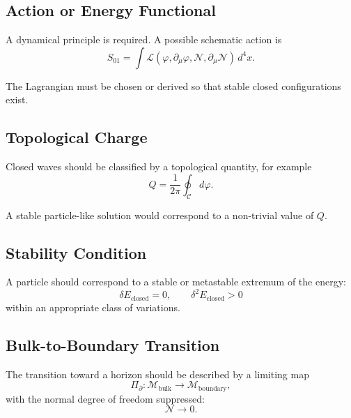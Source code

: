 \documentclass[11pt,a4paper]{article}
\newcommand{\phase}{\varphi}
\newcommand{\normal}{\mathcal{N}}
\newcommand{\memory}{\mathcal{M}}
\newcommand{\contour}{\mathcal{C}}
\begin{document}
\subsection*{Action or Energy Functional}

A dynamical principle is required. A possible schematic action is
\begin{equation}
S_{01} = \int \mathcal{L}(\phase, \partial_\mu \phase, \normal, \partial_\mu \normal)\, d^4x.
\end{equation}

The Lagrangian must be chosen or derived so that stable closed configurations exist.

\subsection*{Topological Charge}

Closed waves should be classified by a topological quantity, for example
\begin{equation}
Q = \frac{1}{2\pi}\oint_{\contour} d\phase.
\end{equation}

A stable particle-like solution would correspond to a non-trivial value of $Q$.

\subsection*{Stability Condition}

A particle should correspond to a stable or metastable extremum of the energy:
\begin{equation}
\delta E_{\mathrm{closed}} = 0, \qquad \delta^2 E_{\mathrm{closed}} > 0
\end{equation}
within an appropriate class of variations.

\subsection*{Bulk-to-Boundary Transition}

The transition toward a horizon should be described by a limiting map
\begin{equation}
\Pi_{\partial}: \memory_{\mathrm{bulk}} \rightarrow \memory_{\mathrm{boundary}},
\end{equation}
with the normal degree of freedom suppressed:
\begin{equation}
\normal \rightarrow 0.
\end{equation}
\end{document}
